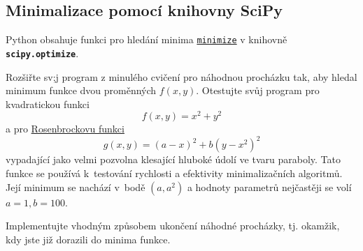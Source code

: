 \documentclass[a4paper,11pt,twoside]{article}
\def\code#1{\textnormal{\texttt{#1}}}
\def\file#1{\textnormal{\textbf{\texttt{#1}}}}
\theoremstyle{red}
\theoremstyle{green}
\begin{document}
\subsection{Minimalizace pomocí knihovny SciPy}
    Python obsahuje funkci pro hledání minima \code{\href{https://docs.scipy.org/doc/scipy/reference/generated/scipy.optimize.minimize.html}{minimize}} v knihovně \file{scipy.optimize}.
    
\begin{solved}
    Rozšiřte sv;j program z minulého cvičení pro náhodnou procházku tak, aby hledal minimum funkce dvou proměnných $f(x,y)$.
    Otestujte svůj program pro kvadratickou funkci
    \begin{equation}\label{eq:Minimumf}
        f(x,y)=x^{2}+y^{2}
    \end{equation}
    a pro \href{https://en.wikipedia.org/wiki/Rosenbrock_function}{Rosenbrockovu funkci}
    \begin{equation}\label{eq:Minimumg}
        g(x,y)=(a-x)^{2}+b\left(y-x^{2}\right)^{2}        
    \end{equation}
    vypadající jako velmi pozvolna klesající hluboké údolí ve tvaru paraboly.
    Tato funkce se používá k~testování rychlosti a efektivity minimalizačních algoritmů.
    Její minimum se nachází v~bodě $\left(a,a^{2}\right)$ a hodnoty parametrů nejčastěji se volí $a=1,b=100$.   
    
    Implementujte vhodným způsobem ukončení náhodné procházky, tj. okamžik, kdy jste již dorazili do minima funkce.
\end{solved}
\end{document}
